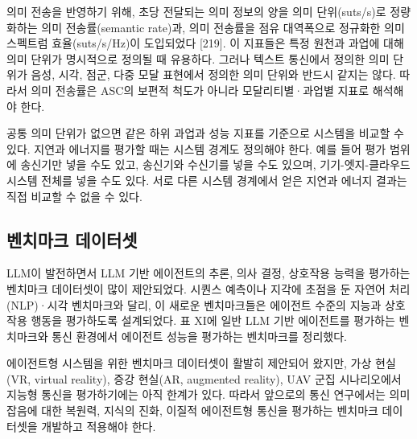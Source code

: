 의미 전송을 반영하기 위해, 초당 전달되는 의미 정보의 양을 의미 단위(suts/s)로 정량화하는 의미 전송률(semantic rate)과, 의미 전송률을 점유 대역폭으로 정규화한 의미 스펙트럼 효율(suts/s/Hz)이 도입되었다 [219]. 이 지표들은 특정 원천과 과업에 대해 의미 단위가 명시적으로 정의될 때 유용하다. 그러나 텍스트 통신에서 정의한 의미 단위가 음성, 시각, 점군, 다중 모달 표현에서 정의한 의미 단위와 반드시 같지는 않다. 따라서 의미 전송률은 ASC의 보편적 척도가 아니라 모달리티별·과업별 지표로 해석해야 한다.

공통 의미 단위가 없으면 같은 하위 과업과 성능 지표를 기준으로 시스템을 비교할 수 있다. 지연과 에너지를 평가할 때는 시스템 경계도 정의해야 한다. 예를 들어 평가 범위에 송신기만 넣을 수도 있고, 송신기와 수신기를 넣을 수도 있으며, 기기-엣지-클라우드 시스템 전체를 넣을 수도 있다. 서로 다른 시스템 경계에서 얻은 지연과 에너지 결과는 직접 비교할 수 없을 수 있다.

\subsection{벤치마크 데이터셋}

LLM이 발전하면서 LLM 기반 에이전트의 추론, 의사 결정, 상호작용 능력을 평가하는 벤치마크 데이터셋이 많이 제안되었다. 시퀀스 예측이나 지각에 초점을 둔 자연어 처리(NLP)·시각 벤치마크와 달리, 이 새로운 벤치마크들은 에이전트 수준의 지능과 상호작용 행동을 평가하도록 설계되었다. 표 XI에 일반 LLM 기반 에이전트를 평가하는 벤치마크와 통신 환경에서 에이전트 성능을 평가하는 벤치마크를 정리했다.

에이전트형 시스템을 위한 벤치마크 데이터셋이 활발히 제안되어 왔지만, 가상 현실(VR, virtual reality), 증강 현실(AR, augmented reality), UAV 군집 시나리오에서 지능형 통신을 평가하기에는 아직 한계가 있다. 따라서 앞으로의 통신 연구에서는 의미 잡음에 대한 복원력, 지식의 진화, 이질적 에이전트형 통신을 평가하는 벤치마크 데이터셋을 개발하고 적용해야 한다.

